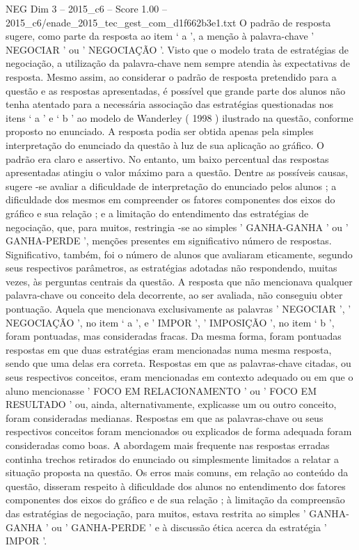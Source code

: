 \begin{textsample}{NEG Dim 3 – 2015\_c6 – Score 1.00 – 2015\_c6/enade\_2015\_tec\_gest\_com\_d1f662b3e1.txt}
O padrão de resposta sugere, como parte da resposta ao item ‘ a ’, a menção à palavra-chave ' NEGOCIAR ' ou ' NEGOCIAÇÃO '.
Visto que o modelo trata de estratégias de negociação, a utilização da palavra-chave nem sempre atendia às expectativas de resposta.
Mesmo assim, ao considerar o padrão de resposta pretendido para a questão e as respostas apresentadas, é possível que grande parte dos alunos não tenha atentado para a necessária associação das estratégias questionadas nos itens ‘ a ’ e ‘ b ’ ao modelo de Wanderley ( 1998 ) ilustrado na questão, conforme proposto no enunciado.
A resposta podia ser obtida apenas pela simples interpretação do enunciado da questão à luz de sua aplicação ao gráfico.
O padrão era claro e assertivo.
No entanto, um baixo percentual das respostas apresentadas atingiu o valor máximo para a questão.
Dentre as possíveis causas, sugere -se avaliar a dificuldade de interpretação do enunciado pelos alunos ; a dificuldade dos mesmos em compreender os fatores componentes dos eixos do gráfico e sua relação ; e a limitação do entendimento das estratégias de negociação, que, para muitos, restringia -se ao simples ' GANHA-GANHA ' ou ' GANHA-PERDE ', menções presentes em significativo número de respostas.
Significativo, também, foi o número de alunos que avaliaram eticamente, segundo seus respectivos parâmetros, as estratégias adotadas não respondendo, muitas vezes, às perguntas centrais da questão.
A resposta que não mencionava qualquer palavra-chave ou conceito dela decorrente, ao ser avaliada, não conseguiu obter pontuação.
Aquela que mencionava exclusivamente as palavras ' NEGOCIAR ', ' NEGOCIAÇÃO ', no item ‘ a ’, e ' IMPOR ', ' IMPOSIÇÃO ', no item ‘ b ’, foram pontuadas, mas consideradas fracas.
Da mesma forma, foram pontuadas respostas em que duas estratégias eram mencionadas numa mesma resposta, sendo que uma delas era correta.
Respostas em que as palavras-chave citadas, ou seus respectivos conceitos, eram mencionadas em contexto adequado ou em que o aluno mencionasse ' FOCO EM RELACIONAMENTO ' ou ' FOCO EM RESULTADO ' ou, ainda, alternativamente, explicasse um ou outro conceito, foram consideradas medianas.
Respostas em que as palavras-chave ou seus respectivos conceitos foram mencionados ou explicados de forma adequada foram consideradas como boas.
A abordagem mais frequente nas respostas erradas continha trechos retirados do enunciado ou simplesmente limitados a relatar a situação proposta na questão.
Os erros mais comuns, em relação ao conteúdo da questão, disseram respeito à dificuldade dos alunos no entendimento dos fatores componentes dos eixos do gráfico e de sua relação ; à limitação da compreensão das estratégias de negociação, para muitos, estava restrita ao simples ' GANHA-GANHA ' ou ' GANHA-PERDE ' e à discussão ética acerca da estratégia ' IMPOR '.

\end{textsample}
